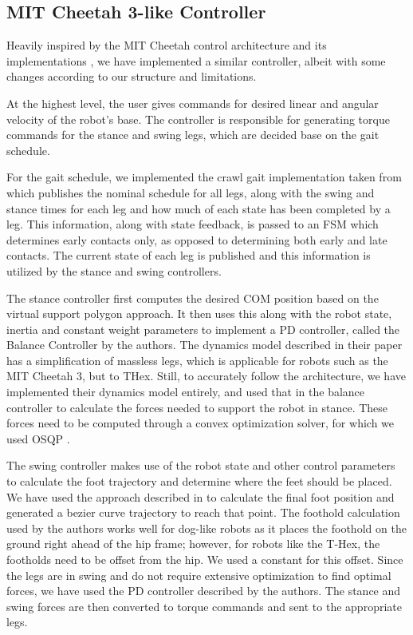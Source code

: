 \subsection{MIT Cheetah 3-like Controller}

Heavily inspired by the MIT Cheetah \cite{bledtMITCheetah32018} control architecture and its implementations \cite{mit_cheetah_github, shuo_yang_github, pympc_github}, we have implemented a similar controller, albeit with some changes according to our structure and limitations.


At the highest level, the user gives commands for desired linear and angular velocity of the robot's base. The controller is responsible for generating torque commands for the stance and swing legs, which are decided base on the gait schedule. 

For the gait schedule, we implemented the crawl gait implementation taken from \cite{shuo_yang_github} which publishes the nominal schedule for all legs, along with the swing and stance times for each leg and how much of each state has been completed by a leg. This information, along with state feedback, is passed to an FSM which determines early contacts only, as opposed to \cite{bledtMITCheetah32018} determining both early and late contacts. The current state of each leg is published and this information is utilized by the stance and swing controllers. 

The stance controller first computes the desired COM position based on the virtual support polygon approach. It then uses this along with the robot state, inertia and constant weight parameters to implement a PD controller, called the Balance Controller by the authors. The dynamics model described in their paper has a simplification of massless legs, which is applicable for robots such as the MIT Cheetah 3, but to THex. Still, to accurately follow the architecture, we have implemented their dynamics model entirely, and used that in the balance controller to calculate the forces needed to support the robot in stance. These forces need to be computed through a convex optimization solver, for which we used OSQP \cite{osqp}.

The swing controller makes use of the robot state and other control parameters to calculate the foot trajectory and determine where the feet should be placed. We have used the approach described in \cite{bledtMITCheetah32018} to calculate the final foot position and generated a bezier curve trajectory to reach that point. The foothold calculation used by the authors works well for dog-like robots as it places the foothold on the ground right ahead of the hip frame; however, for robots like the T-Hex, the footholds need to be offset from the hip. We used a constant for this offset. Since the legs are in swing and do not require extensive optimization to find optimal forces, we have used the PD controller described by the authors. The stance and swing forces are then converted to torque commands and sent to the appropriate legs.

